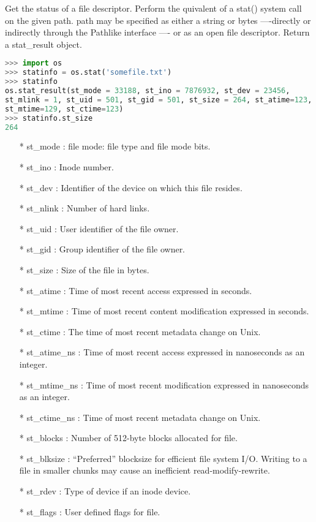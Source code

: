 \noindent{\color{red}{os.stat(path, *, dir\_fd=None, follow\_symlinks=True):}}
\par{Get the status of a file descriptor. Perform the quivalent of a stat() system call on the
given path. path may be specified as either a string or bytes ----directly or indirectly
through the Pathlike interface ---- or as an open file descriptor. Return a stat\_result
object.}\\
\begin{lstlisting}[language=Python]
>>> import os
>>> statinfo = os.stat('somefile.txt')
>>> statinfo
os.stat_result(st_mode = 33188, st_ino = 7876932, st_dev = 23456,
st_mlink = 1, st_uid = 501, st_gid = 501, st_size = 264, st_atime=123,
st_mtime=129, st_ctime=123)
>>> statinfo.st_size
264
\end{lstlisting}
\begin{itemize}
\item[*] st\_mode : file mode: file type and file mode bits.
\item[*] st\_ino : Inode number.
\item[*] st\_dev : Identifier of the device on which this file resides.
\item[*]{st\_nlink : Number of hard links.}
\item[*]{st\_uid : User identifier of the file owner.}
\item[*]{st\_gid : Group identifier of the file owner.}
\item[*]{st\_size : Size of the file in bytes.}
\item[*]{st\_atime : Time of most recent access expressed in seconds.}
\item[*]{st\_mtime : Time of most recent content modification expressed in seconds.}
\item[*]{st\_ctime : The time of most recent metadata change on Unix.}
\item[*]{st\_atime\_ns : Time of most recent access expressed in nanoseconds as an integer.}
\item[*]{st\_mtime\_ns : Time of most recent modification expressed in nanoseconds as an integer.}
\item[*]{st\_ctime\_ns : Time of most recent metadata change on Unix.}
\item[*]{st\_blocks : Number of 512-byte blocks allocated for file.}
\item[*]{st\_blksize : \textquotedblleft{Preferred}\textquotedblright{} blocksize for efficient
file system I/O. Writing to a file in smaller chunks may cause an inefficient read-modify-rewrite.}
\item[*]{st\_rdev : Type of device if an inode device.}
\item[*]{st\_flags : User defined flags for file.}
\end{itemize}


